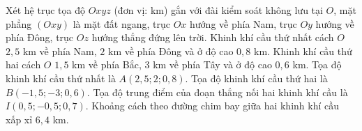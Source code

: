 \begin{ex}
Xét hệ trục tọa độ $Oxyz$ (đơn vị: km) gắn với đài kiểm soát không lưu tại $O$, mặt phẳng $(Oxy)$ là mặt đất ngang, trục $Ox$ hướng về phía Nam, trục $Oy$ hướng về phía Đông, trục $Oz$ hướng thẳng đứng lên trời. Khinh khí cầu thứ nhất cách $O$ $2{,}5$ km về phía Nam, $2$ km về phía Đông và ở độ cao $0{,}8$ km. Khinh khí cầu thứ hai cách $O$ $1{,}5$ km về phía Bắc, $3$ km về phía Tây và ở độ cao $0{,}6$ km.
\choiceTF
{\True Tọa độ khinh khí cầu thứ nhất là $A(2{,}5;2;0{,}8)$.}
{\True Tọa độ khinh khí cầu thứ hai là $B(-1{,}5;-3;0{,}6)$.}
{\True Tọa độ trung điểm của đoạn thẳng nối hai khinh khí cầu là $I(0{,}5;-0{,}5;0{,}7)$.}
{\True Khoảng cách theo đường chim bay giữa hai khinh khí cầu xấp xỉ $6{,}4$ km.}
\end{ex}
